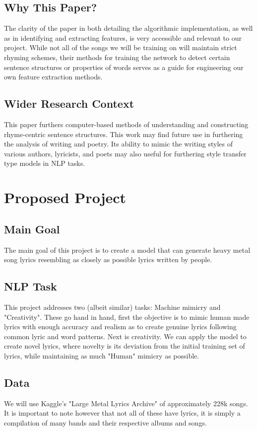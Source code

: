 \documentclass[11pt]{article}
\begin{document}
\subsection{Why This Paper?}
The clarity of the paper in both detailing the algorithmic implementation, as well as in identifying and extracting features, is very accessible and relevant to our project. While not all of the songs we will be training on will maintain strict rhyming schemes, their methods for training the network to detect certain sentence structures or properties of words serves as a guide for engineering our own feature extraction methods.
\subsection{Wider Research Context}
This paper furthers computer-based methods of understanding and constructing rhyme-centric sentence structures. This work may find future use in furthering the analysis of writing and poetry. Its ability to mimic the writing styles of various authors, lyricists, and poets may also useful for furthering style transfer type models in NLP tasks.
\section{Proposed Project}

\subsection{Main Goal}
The main goal of this project is to create a model that can generate heavy metal song lyrics resembling as closely as possible lyrics written by people.
\subsection{NLP Task} %
This project addresses two (albeit similar) tasks: Machine mimicry and "Creativity". These go hand in hand, first the objective is to mimic human made lyrics with enough accuracy and realism as to create genuine lyrics following common lyric and word patterns. Next is creativity. We can apply the model to create novel lyrics, where novelty is its deviation from the initial training set of lyrics, while maintaining as much "Human" mimicry as possible.
\subsection{Data} %
We will use Kaggle's "Large Metal Lyrics Archive" of approximately 228k songs. It is important to note however that not all of these have lyrics, it is simply a compilation of many bands and their respective albums and songs.
\end{document}

